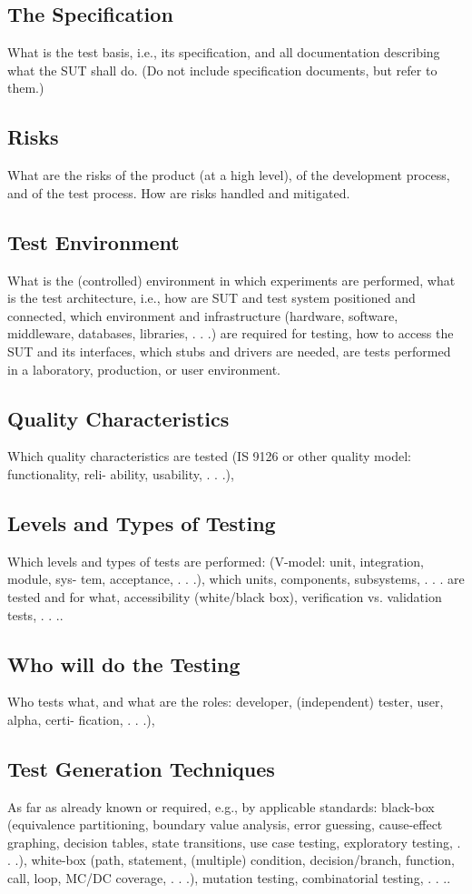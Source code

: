 \documentclass[11pt,a4paper]{article}
\begin{document}
\subsection{The Specification}
\label{sec:orgheadline21}
What is the test basis, i.e., its specification, and all documentation describing what the SUT
shall do. (Do not include specification documents, but refer to them.)
\subsection{Risks}
\label{sec:orgheadline22}
What are the risks of the product (at a high level), of the development process, and of the
test process. How are risks handled and mitigated.
\subsection{Test Environment}
\label{sec:orgheadline23}
What is the (controlled) environment in which experiments are performed, what is the test
architecture, i.e., how are SUT and test system positioned and connected, which environment
and infrastructure (hardware, software, middleware, databases, libraries, . . .) are required for
testing, how to access the SUT and its interfaces, which stubs and drivers are needed, are
tests performed in a laboratory, production, or user environment.
\subsection{Quality Characteristics}
\label{sec:orgheadline24}
Which quality characteristics are tested (IS 9126 or other quality model: functionality, reli-
ability, usability, . . .),
\subsection{Levels and Types of Testing}
\label{sec:orgheadline25}
Which levels and types of tests are performed: (V-model: unit, integration, module, sys-
tem, acceptance, . . .), which units, components, subsystems, . . . are tested and for what,
accessibility (white/black box), verification vs. validation tests, . . ..
\subsection{Who will do the Testing}
\label{sec:orgheadline26}
Who tests what, and what are the roles: developer, (independent) tester, user, alpha, certi-
fication, . . .),
\subsection{Test Generation Techniques}
\label{sec:orgheadline27}
As far as already known or required, e.g., by applicable standards: black-box (equivalence
partitioning, boundary value analysis, error guessing, cause-effect graphing, decision tables,
state transitions, use case testing, exploratory testing, . . .), white-box (path, statement,
(multiple) condition, decision/branch, function, call, loop, MC/DC coverage, . . .), mutation
testing, combinatorial testing, . . ..
\end{document}

